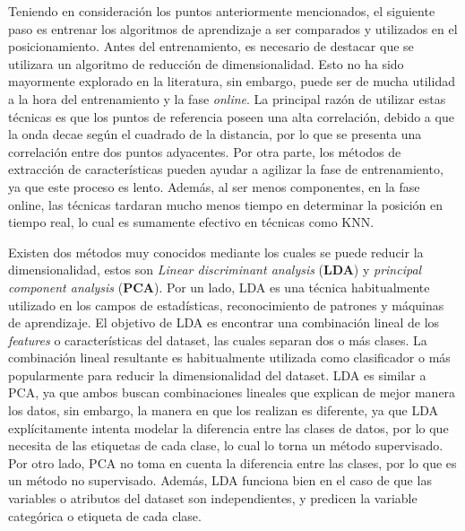 Teniendo en consideración los puntos anteriormente mencionados, el siguiente paso es entrenar los algoritmos de aprendizaje a ser comparados y utilizados en el posicionamiento. Antes del entrenamiento, es necesario de destacar que se utilizara un algoritmo de reducción de dimensionalidad. Esto no ha sido mayormente explorado en la literatura, sin embargo, puede ser de mucha utilidad a la hora del entrenamiento y la fase \textit{online}. La principal razón de utilizar estas técnicas es que los puntos de referencia poseen una alta correlación, debido a que la onda decae según el cuadrado de la distancia, por lo que se presenta una correlación entre dos puntos adyacentes. Por otra parte, los métodos de extracción de características pueden ayudar a agilizar la fase de entrenamiento, ya que este proceso es lento. Además, al ser menos componentes, en la fase online, las técnicas tardaran mucho menos tiempo en determinar la posición en tiempo real, lo cual es sumamente efectivo en técnicas como KNN.

Existen dos métodos muy conocidos mediante los cuales se puede reducir la dimensionalidad, estos son \textit{Linear discriminant analysis}      (\textbf{LDA}) y \textit{principal component analysis} (\textbf{PCA}). Por un lado, LDA es una técnica habitualmente utilizado en los campos de estadísticas, reconocimiento de patrones y máquinas de aprendizaje. El objetivo de LDA es encontrar una combinación lineal de los \textit{features} o características del dataset, las cuales separan dos o más clases. La combinación lineal resultante es habitualmente utilizada como clasificador o más popularmente para reducir la dimensionalidad del dataset. LDA es similar a PCA, ya que ambos buscan combinaciones lineales que explican de mejor manera los datos, sin embargo, la manera en que los realizan es diferente, ya que LDA explícitamente intenta modelar la diferencia entre las clases de datos, por lo que necesita de las etiquetas de cada clase, lo cual lo torna un método supervisado. Por otro lado, PCA no toma en cuenta la diferencia entre las clases, por lo que es un método no supervisado. Además, LDA funciona bien en el caso de que las variables o atributos del dataset son independientes, y predicen la variable categórica o etiqueta de cada clase.

